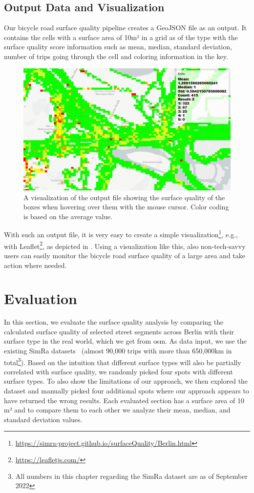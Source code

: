 \subsection{Output Data and Visualization}
\label{subsec:output_data_and_visualization}
Our bicycle road surface quality pipeline creates a GeoJSON file as an output.
It contains the cells with a surface area of 10m² in a grid as  of the  type  with the surface quality score information such as mean, median, standard deviation, number of trips going through the cell and coloring information in the  key.
 \begin{figure}
    \centering
    \includegraphics[width=0.7\columnwidth]{fig/visualization.png}
    \caption{%
A visualization of the output file showing the surface quality of the boxes when hovering over them with the mouse cursor. Color coding is based on the average value.}%
    \label{fig:visualization}
\end{figure}
With such an output file, it is very easy to create a simple visualization\footnote{\url{https://simra-project.github.io/surfaceQuality/Berlin.html}}, e.g., with Leaflet\footnote{\url{https://leafletjs.com/}}, as depicted in .
Using a visualization like this, also non-tech-savvy users can easily monitor the bicycle road surface quality of a large area and take action where needed.


\section{Evaluation}
\label{sec:evaluation_cyclequality}
In this section, we evaluate the surface quality analysis by comparing the calculated surface quality of selected street segments across Berlin with their surface type in the real world, which we get from \ac{osm}.
As data input, we use the existing SimRa datasets~\cite{dataset_simra_set1,dataset_simra_set2,dataset_simra_set3} (almost 90,000 trips with more than 650,000km in total\footnote{All numbers in this chapter regarding the SimRa dataset are as of September 2022}).
Based on the intuition that different surface types will also be partially correlated with surface quality, we randomly picked four spots with different surface types.
To also show the limitations of our approach, we then explored the dataset and manually picked four additional spots where our approach appears to have returned the wrong results.
Each evaluated section has a surface area of 10 m² and to compare them to each other we analyze their mean, median, and standard deviation values.

